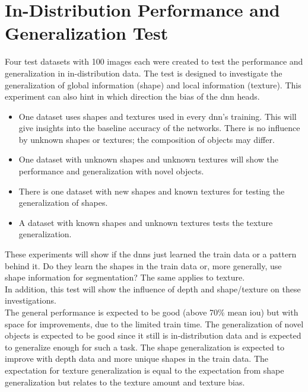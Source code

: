 	\section{In-Distribution Performance and Generalization Test}
	\label{sec:in-distribution-performance-generalization}
		Four test datasets with 100 images each were created to test the performance and generalization in in-distribution data. The test is designed to investigate the generalization of global information (shape) and local information (texture). This experiment can also hint in which direction the bias of the \ac{dnn} heads.
		\begin{itemize}
			\item One dataset uses shapes and textures used in every \ac{dnn}'s training. This will give insights into the baseline accuracy of the networks. There is no influence by unknown shapes or textures; the composition of objects may differ.
			\item One dataset with unknown shapes and unknown textures will show the performance and generalization with novel objects.
			\item There is one dataset with new shapes and known textures for testing the generalization of shapes. 
			\item A dataset with known shapes and unknown textures tests the texture generalization.
		\end{itemize}
		These experiments will show if the \ac{dnn}s just learned the train data or a pattern behind it. Do they learn the shapes in the train data or, more generally, use shape information for segmentation? The same applies to texture.\\
		In addition, this test will show the influence of depth and shape/texture on these investigations.\\
		The general performance is expected to be good (above 70\% mean \ac{iou}) but with space for improvements, due to the limited train time. The generalization of novel objects is expected to be good since it still is in-distribution data and is expected to generalize enough for such a task. The shape generalization is expected to improve with depth data and more unique shapes in the train data. The expectation for texture generalization is equal to the expectation from shape generalization but relates to the texture amount and texture bias.\\
